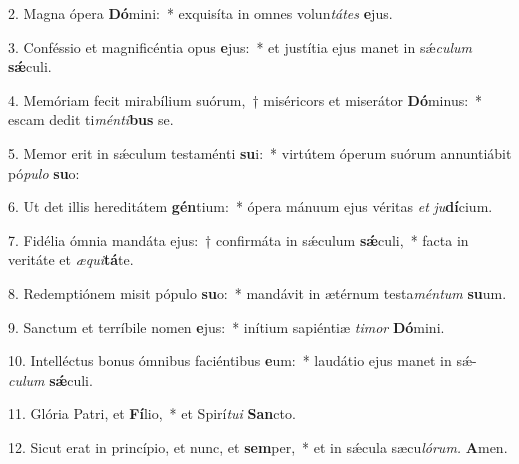\item 2. Magna ópera \textbf{Dó}mini:~* exquisíta in omnes volun\hspace{0.03em}\textit{tátes} \textbf{e}jus.
\item 3. Conféssio et magnificéntia opus \textbf{e}jus:~* et justítia ejus manet in sǽ\hspace{0.03em}\textit{culum} \textbf{sǽ}culi.
\item 4. Memóriam fecit mirabílium suórum,~† miséricors et miserátor \textbf{Dó}minus:~* escam dedit ti\textit{ménti}\textbf{bus} se.
\item 5. Memor erit in sǽculum testaménti \textbf{su}i:~* virtútem óperum suórum annuntiábit pó\textit{pulo} \textbf{su}o:
\item 6. Ut det illis hereditátem \textbf{gén}tium:~* ópera mánuum ejus véritas \textit{et} \textit{ju}\textbf{dí}cium.
\item 7. Fidélia ómnia mandáta ejus:~† confirmáta in sǽculum \textbf{sǽ}culi,~* facta in veritáte et \textit{æqui}\textbf{tá}te.
\item 8. Redemptiónem misit pópulo \textbf{su}o:~* mandávit in ætérnum testa\hspace{0.03em}\textit{méntum} \textbf{su}um.
\item 9. Sanctum et terríbile nomen \textbf{e}jus:~* inítium sapiéntiæ \textit{timor} \textbf{Dó}mini.
\item 10. Intelléctus bonus ómnibus faciéntibus \textbf{e}um:~* laudátio ejus manet in sǽ-\hspace{0.03em}\textit{culum} \textbf{sǽ}culi.
\item 11. Glória Patri, et \textbf{Fí}lio,~* et Spirí\hspace{0.03em}\textit{tui} \textbf{San}cto.
\item 12. Sicut erat in princípio, et nunc, et \textbf{sem}per,~* et in sǽcula sæcu\hspace{0.03em}\textit{lórum.} \textbf{A}men.